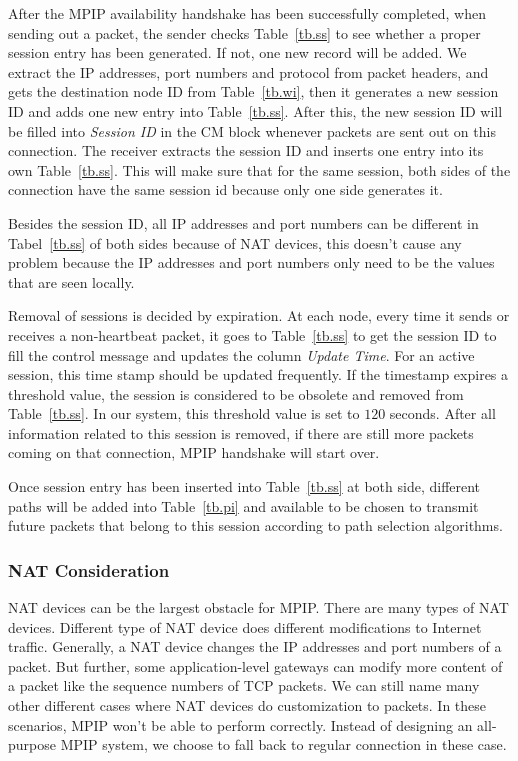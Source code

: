 After the MPIP availability handshake has been successfully completed, when sending out a packet, the sender checks Table~\ref{tb.ss} to see whether a proper session entry has been generated. If not, one new record will be added. We extract the IP addresses, port numbers and protocol from packet headers, and gets the destination node ID from Table~\ref{tb.wi}, then it generates a new session ID and adds one new entry into Table~\ref{tb.ss}. After this, the new session ID will be filled into \emph{Session ID} in the CM block whenever packets are sent out on this connection. The receiver extracts the session ID and inserts one entry into its own Table~\ref{tb.ss}. This will make sure that for the same session, both sides of the connection have the same session id because only one side generates it.

Besides the session ID, all IP addresses and port numbers can be different in Tabel~\ref{tb.ss} of both sides because of NAT devices, this doesn't cause any problem because the IP addresses and port numbers only need to be the values that are seen locally.

Removal of sessions is decided by expiration. At each node, every time it sends or receives a non-heartbeat packet, it goes to Table~\ref{tb.ss} to get the session ID to fill the control message and updates the column \emph{Update Time}. For an active session, this time stamp should be updated frequently. If the timestamp expires a threshold value, the session is considered to be obsolete and removed from Table~\ref{tb.ss}. In our system, this threshold value is set to $120$ seconds. After all information related to this session is removed, if there are still more packets coming on that connection, MPIP handshake will start over.

Once session entry has been inserted into Table~\ref{tb.ss} at both side, different paths will be added into Table~\ref{tb.pi} and available to be chosen to transmit future packets that belong to this session according to path selection algorithms.

\subsubsection{NAT Consideration}

NAT devices can be the largest obstacle for MPIP. There are many types of NAT devices. Different type of NAT device does different modifications to Internet traffic. Generally, a NAT device changes the IP addresses and port numbers of a packet. But further, some application-level gateways can modify more content of a packet like the sequence numbers of TCP packets. We can still name many other different cases where NAT devices do customization to packets. In these scenarios, MPIP won't be able to perform correctly. Instead of designing an all-purpose MPIP system, we choose to fall back to regular connection in these case.

